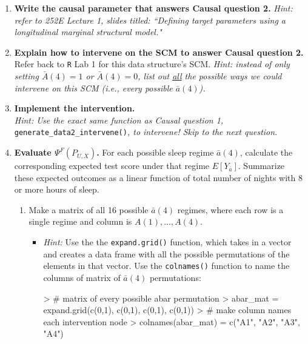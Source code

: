 \documentclass[answers]{exam}
\begin{document}
\begin{enumerate}
\item \textbf{Write the causal parameter that answers Causal question 2.} \textit{Hint: refer to 252E Lecture 1, slides titled: ``Defining target parameters using a longitudinal marginal structural model."}
\item \textbf{Explain how to intervene on the SCM to answer Causal question 2.} Refer back to \texttt{R} Lab 1 for this data structure's SCM. \textit{Hint: instead of only setting $\bar{A}(4)=1$ or $\bar{A}(4)=0$, list out \underline{all} the possible ways we could intervene on this SCM (i.e., every possible $\bar{a}(4)$).}
\item \textbf{Implement the intervention.}\\
\emph{Hint: Use the exact same function as Causal question 1,} \texttt{generate\_data2\_intervene()}\emph{, to intervene! Skip to the next question.}
\item \textbf{Evaluate $\Psi^F(P_{U,X})$.} For each possible sleep regime $\bar{a}(4)$, calculate the corresponding expected test score under that regime $E[Y_{\bar{a}}]$. Summarize these expected outcomes as a linear function of total number of nights with 8 or more hours of sleep. %
\begin{enumerate}
\item Make a matrix of all 16 possible $\bar{a}(4)$ regimes, where each row is a single regime and column is $A(1), ..., A(4)$.
\begin{itemize}
\item[] \textit{Hint:} Use the the \texttt{expand.grid()} function, which takes in a vector and creates a data frame with all the possible permutations of the elements in that vector. Use the \texttt{colnames()} function to name the columns of matrix of $\bar{a}(4)$ permutations:
\begin{Schunk}
\begin{Sinput}
> # matrix of every possible abar permutation
> abar_mat = expand.grid(c(0,1), c(0,1), c(0,1), c(0,1))
> # make column names each intervention node
> colnames(abar_mat) = c("A1", "A2", "A3", "A4")
\end{Sinput}
\end{Schunk}

\end{itemize}
\end{enumerate}
\end{enumerate}
\end{document}

